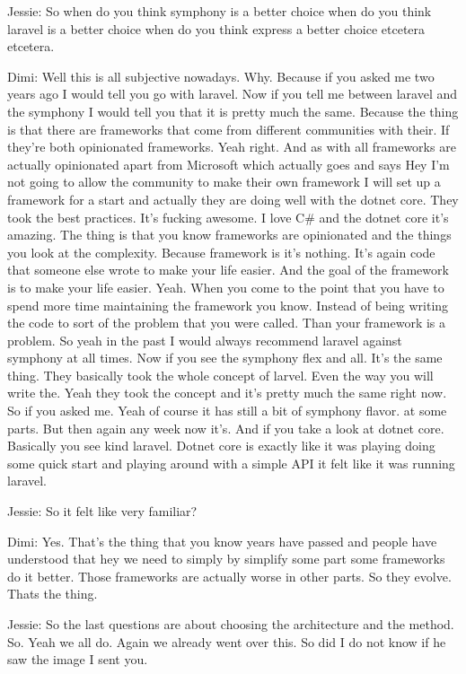 Jessie: So when do you think symphony is a better choice when do you think laravel is a better choice when do you think express a better choice etcetera etcetera.

Dimi: Well this is all subjective nowadays. Why. Because if you asked me two years ago I would tell you go with laravel. Now if you tell me between laravel and the symphony I would tell you that it is pretty much the same. Because the thing is that there are frameworks that come from different communities with their. If they're both opinionated frameworks. Yeah right. And as with all frameworks are actually opinionated apart from Microsoft which actually goes and says Hey I'm not going to allow the community to make their own framework I will set up a framework for a start and actually they are doing well with the dotnet core. They took the best practices. It's fucking awesome. I love C\# and the dotnet core it's amazing. The thing is that you know frameworks are opinionated and the things you look at the complexity. Because framework is it's nothing. It's again code that someone else wrote to make your life easier. And the goal of the framework is to make your life easier. Yeah. When you come to the point that you have to spend more time maintaining the framework you know. Instead of being writing the code to sort of the problem that you were called. Than your framework is a problem. So yeah in the past I would always recommend laravel against symphony at all times. Now if you see the symphony flex and all. It's the same thing. They basically took the whole concept of larvel. Even the way you will write the. Yeah they took the concept and it's pretty much the same right now. So if you asked me. Yeah of course it has still a bit of symphony flavor. at some parts. But then again any week now it's. And if you take a look at dotnet core. Basically you see kind laravel. Dotnet core is exactly like it was playing doing some quick start and playing around with a simple API it felt like it was running laravel.

Jessie: So it felt like very familiar?

Dimi: Yes. That's the thing that you know years have passed and people have understood that hey we need to simply by simplify some part some frameworks do it better. Those frameworks are actually worse in other parts. So they evolve. Thats the thing.

Jessie: So the last questions are about choosing the architecture and the method. So. Yeah we all do. Again we already went over this. So did I do not know if he saw the image I sent you.

